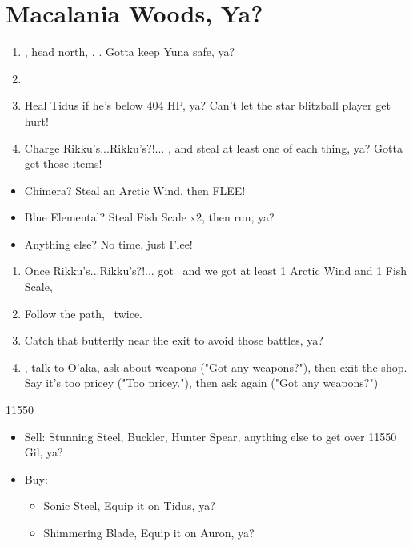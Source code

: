 \chapter{Macalania Woods, Ya?}

\begin{enumerate}
    \item \sd, head north, \sd, \save. Gotta keep Yuna safe, ya?
    \item \formation{\tidus}{\rikku}{\auron}
    \item Heal Tidus if he's below 404 HP, ya? Can't let the star blitzball player get hurt!
    \item Charge Rikku's...Rikku's?!... \od, and steal at least one of each thing, ya? Gotta get those items!
\end{enumerate}
\begin{encounters}
    \begin{itemize}
        \item Chimera? Steal an Arctic Wind, then FLEE!
        \item Blue Elemental? Steal Fish Scale x2, then run, ya?
        \item Anything else? No time, just Flee!
    \end{itemize}
\end{encounters}
\begin{enumerate}[resume]
    \item Once Rikku's...Rikku's?!... got \od\ and we got at least 1 Arctic Wind and 1 Fish Scale, \formation{\tidus}{\kimahri}{\auron}
    \item Follow the path, \sd\ twice.
    \item Catch that butterfly near the exit to avoid those battles, ya?
    \formation{\tidus}{\kimahri}{\auron}
    \item \save, talk to O'aka, ask about weapons ("Got any weapons?"), then exit the shop. Say it's too pricey ("Too pricey."), then ask again ("Got any weapons?")
\end{enumerate}
\begin{shop}{11550}
    \begin{itemize}
        \item Sell: Stunning Steel, Buckler, Hunter Spear, anything else to get over 11550 Gil, ya?
        \item Buy:
        \begin{itemize}
            \item Sonic Steel, Equip it on Tidus, ya?
            \item Shimmering Blade, Equip it on Auron, ya?
        \end{itemize}
    \end{itemize}
\end{shop}
